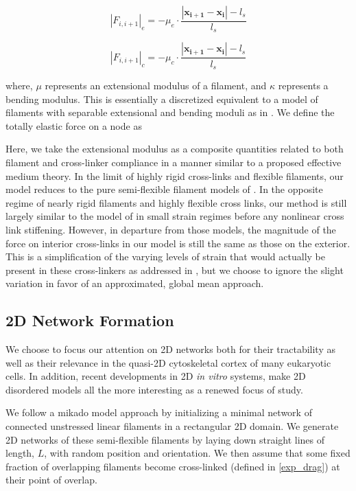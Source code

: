 \documentclass[10pt,letterpaper]{article}
\begin{document}
\begin{equation}
|F_{i,i+1}|_{e} = -\mu_e\cdot\frac{|\mathbf{x_{i+1}}-\mathbf{x_i}|-l_s}{l_s} 
\end{equation}

\begin{equation}
|F_{i,i+1}|_{c} = -\mu_c\cdot\frac{|\mathbf{x_{i+1}}-\mathbf{x_i}|-l_s}{l_s} 
\end{equation}



where, $\mu$ represents an extensional modulus of a filament, and $\kappa$ represents a bending modulus.   This is essentially a discretized equivalent to a model of filaments with separable extensional and bending moduli as in \cite{theo_hlm}.  We define the totally elastic force on a node as

Here, we take the extensional modulus as a composite quantities related to both filament and cross-linker compliance in a manner similar to a proposed effective medium theory\cite{theo_crosslinknonlinear}.  In the limit of highly rigid cross-links and flexible filaments, our model reduces to the pure semi-flexible filament models of \cite{theo_hlm,theo_hlm2}.  In the opposite regime of nearly rigid filaments and highly flexible cross links, our method is still largely similar to the model of \cite{theo_crosslinknonlinear} in small strain regimes before any nonlinear cross link stiffening.  However, in departure from those models, the magnitude of the force on interior cross-links in our model is still the same as those on the exterior.  This is a simplification of the varying levels of strain that would actually be present in these cross-linkers as addressed in \cite{theo_crosslinknonlinear}, but we choose to ignore the slight variation in favor of an approximated, global mean approach.  




\subsection*{2D Network Formation}

We choose to focus our attention on 2D networks both for their tractability as well as their relevance in the quasi-2D cytoskeletal cortex of many eukaryotic cells\cite{cellmech_flows}.  In addition, recent developments in 2D {\em in vitro} systems\cite{rheo_2D1,rheo_2D2}, make 2D disordered models all the more interesting as a renewed focus of study.

We follow a mikado model approach by initializing a minimal network of connected unstressed linear filaments in a rectangular 2D domain.  We generate 2D networks of these semi-flexible filaments by laying down straight lines of length, $L$, with random position and orientation. We then assume that some fixed fraction of overlapping filaments become cross-linked (defined in \ref{exp_drag}) at their point of overlap.
\end{document}
